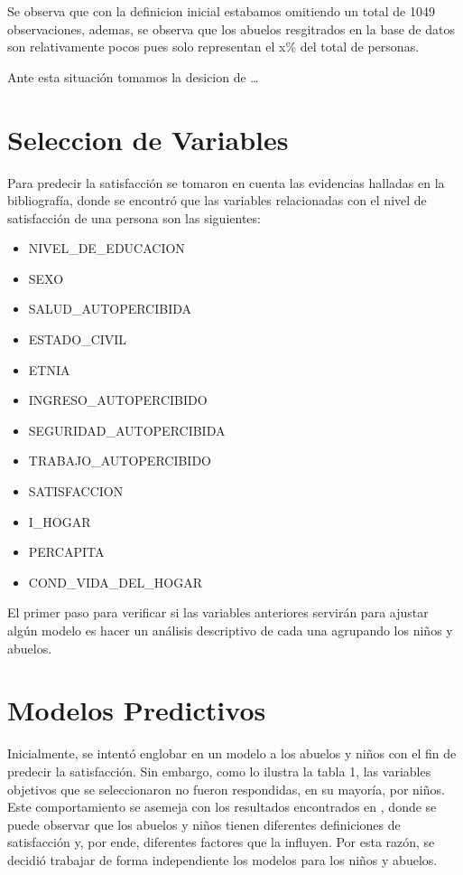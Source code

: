 \documentclass[
]{article}
\providecommand{\tightlist}{%
  \setlength{\itemsep}{0pt}\setlength{\parskip}{0pt}}
\begin{document}
Se observa que con la definicion inicial estabamos omitiendo un total de
1049 observaciones, ademas, se observa que los abuelos resgitrados en la
base de datos son relativamente pocos pues solo representan el x\% del
total de personas.

Ante esta situación tomamos la desicion de \ldots{}

\hypertarget{seleccion-de-variables}{%
\section{Seleccion de Variables}\label{seleccion-de-variables}}

Para predecir la satisfacción se tomaron en cuenta las evidencias
halladas en la bibliografía, donde se encontró que las variables
relacionadas con el nivel de satisfacción de una persona son las
siguientes:

\begin{itemize}
\tightlist
\item
  NIVEL\_DE\_EDUCACION
\item
  SEXO
\item
  SALUD\_AUTOPERCIBIDA
\item
  ESTADO\_CIVIL
\item
  ETNIA
\item
  INGRESO\_AUTOPERCIBIDO
\item
  SEGURIDAD\_AUTOPERCIBIDA
\item
  TRABAJO\_AUTOPERCIBIDO
\item
  SATISFACCION
\item
  I\_HOGAR
\item
  PERCAPITA
\item
  COND\_VIDA\_DEL\_HOGAR
\end{itemize}

El primer paso para verificar si las variables anteriores servirán para
ajustar algún modelo es hacer un análisis descriptivo de cada una
agrupando los niños y abuelos.

\hypertarget{modelos-predictivos}{%
\section{Modelos Predictivos}\label{modelos-predictivos}}

Inicialmente, se intentó englobar en un modelo a los abuelos y niños con
el fin de predecir la satisfacción. Sin embargo, como lo ilustra la
tabla 1, las variables objetivos que se seleccionaron no fueron
respondidas, en su mayoría, por niños. Este comportamiento se asemeja
con los resultados encontrados en \cite{b7}, donde se puede observar que
los abuelos y niños tienen diferentes definiciones de satisfacción y,
por ende, diferentes factores que la influyen. Por esta razón, se
decidió trabajar de forma independiente los modelos para los niños y
abuelos.
\end{document}
